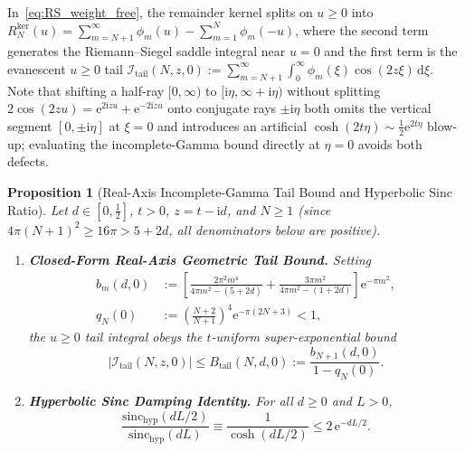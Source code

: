 \documentclass[11pt,reqno]{amsart}
\newtheorem{proposition}[theorem]{Proposition}
\theoremstyle{definition}
\theoremstyle{remark}
\numberwithin{equation}{section}
\newcommand{\dd}{\mathrm{d}}
\newcommand{\ii}{\mathrm{i}}
\newcommand{\ee}{\mathrm{e}}
\newcommand{\sinchyp}{\mathrm{sinc}_{\mathrm{hyp}}}
\begin{document}
In~\eqref{eq:RS_weight_free}, the remainder kernel splits on $u \ge 0$ into $R_N^{\mathrm{ker}}(u) = \sum_{m=N+1}^{\infty} \phi_m(u) - \sum_{m=1}^N \phi_m(-u)$, where the second term generates the Riemann--Siegel saddle integral near $u = 0$ and the first term is the evanescent $u \ge 0$ tail $\mathcal{I}_{\mathrm{tail}}(N, z, 0) := \sum_{m=N+1}^{\infty} \int_0^{\infty} \phi_m(\xi)\cos(2z\xi)\,\dd\xi$. Note that shifting a half-ray $[0, \infty)$ to $[\ii\eta, \infty + \ii\eta)$ without splitting $2\cos(2zu) = \ee^{2\ii zu} + \ee^{-2\ii zu}$ onto conjugate rays $\pm\ii\eta$ both omits the vertical segment $[0, \pm\ii\eta]$ at $\xi = 0$ and introduces an artificial $\cosh(2t\eta) \sim \frac{1}{2}\ee^{2t\eta}$ blow-up; evaluating the incomplete-Gamma bound directly at $\eta = 0$ avoids both defects.

\begin{proposition}[Real-Axis Incomplete-Gamma Tail Bound and Hyperbolic Sinc Ratio]\label{prop:tail_and_sinc}
Let $d \in [0, \frac{1}{2}]$, $t > 0$, $z = t - \ii d$, and $N \ge 1$ (since $4\pi(N+1)^2 \ge 16\pi > 5 + 2d$, all denominators below are positive).
\begin{enumerate}[label=\textup{(\roman*)},leftmargin=2.2em]
\item \textbf{Closed-Form Real-Axis Geometric Tail Bound.} Setting
\begin{align}\label{eq:b_m_real_def}
b_m(d, 0) &:= \left[\frac{2\pi^2 m^4}{4\pi m^2 - (5 + 2d)} + \frac{3\pi m^2}{4\pi m^2 - (1 + 2d)}\right]\ee^{-\pi m^2}, \\
q_N(0) &:= \left(\frac{N+2}{N+1}\right)^{\!4}\ee^{-\pi(2N+3)} < 1,\nonumber
\end{align}
the $u \ge 0$ tail integral obeys the $t$-uniform super-exponential bound
\begin{equation}\label{eq:B_tail_real}
\bigl\lvert\mathcal{I}_{\mathrm{tail}}(N, z, 0)\bigr\rvert \le B_{\mathrm{tail}}(N, d, 0) := \frac{b_{N+1}(d, 0)}{1 - q_N(0)}.
\end{equation}
\item \textbf{Hyperbolic Sinc Damping Identity.} For all $d \ge 0$ and $L > 0$,
\begin{equation}\label{eq:sinc_ratio_id}
\frac{\sinchyp(dL/2)}{\sinchyp(dL)} \equiv \frac{1}{\cosh(dL/2)} \le 2\,\ee^{-dL/2}.
\end{equation}
\end{enumerate}
\end{proposition}
\end{document}

